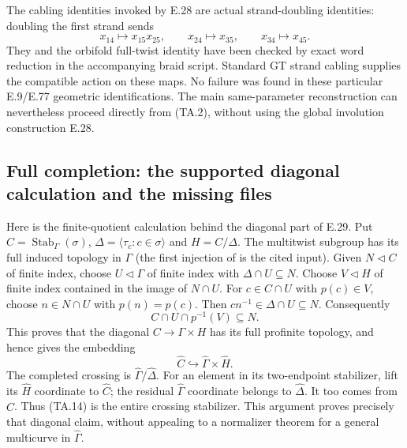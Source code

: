 The cabling identities invoked by E.28 are actual strand-doubling
identities: doubling the first strand sends
\[
 x_{14}\longmapsto x_{15}x_{25},\qquad
 x_{24}\longmapsto x_{35},\qquad
 x_{34}\longmapsto x_{45}.
\]
They and the orbifold full-twist identity have been checked by exact
word reduction in the accompanying braid script.  Standard GT strand
cabling supplies the compatible action on these maps.  No failure was
found in these particular E.9/E.77 geometric identifications.  The main
same-parameter reconstruction can nevertheless proceed directly from
(TA.2), without using the global involution construction E.28.

\subsection{Full completion: the supported diagonal calculation and the missing files}

Here is the finite-quotient calculation behind the diagonal part of E.29.
Put $C=\operatorname{Stab}_\Gamma(\sigma)$,
$\Delta=\langle\tau_c:c\in\sigma\rangle$ and $H=C/\Delta$.
The multitwist subgroup has its full induced topology in $\Gamma$
(the first injection of \cite[Theorem~4.5]{ET_Boggi2014}
is the cited input).
Given $N\triangleleft C$ of finite index, choose
$U\triangleleft\Gamma$ of finite index with $\Delta\cap U\subseteq N$.
Choose $V\triangleleft H$ of finite index contained in the image of
$N\cap U$.  For $c\in C\cap U$ with $p(c)\in V$, choose
$n\in N\cap U$ with $p(n)=p(c)$.  Then
$cn^{-1}\in\Delta\cap U\subseteq N$.  Consequently
\[
       C\cap U\cap p^{-1}(V)\subseteq N.
\]
This proves that the diagonal $C\to\Gamma\times H$ has its full
profinite topology, and hence gives the embedding
\[
          \widehat C\hookrightarrow\widehat\Gamma\times\widehat H.
                                                               \tag{TA.14}
\]
The completed crossing is $\widehat\Gamma/\widehat\Delta$.
For an element in its two-endpoint stabilizer, lift its
$\widehat H$ coordinate to $\widehat C$; the residual
$\widehat\Gamma$ coordinate belongs to $\widehat\Delta$.
It too comes from $\widehat C$.  Thus (TA.14) is the entire
crossing stabilizer.  This argument proves precisely that diagonal
claim, without appealing to a normalizer theorem for a general
multicurve in $\widehat\Gamma$.

